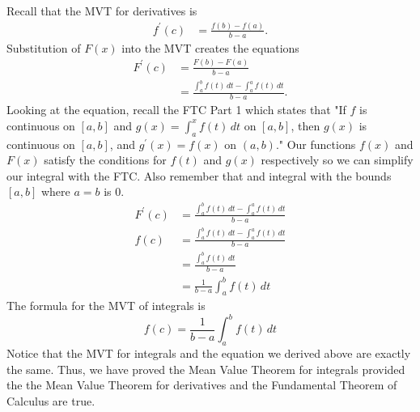 \documentclass{article}
\begin{document}
\begin{enumerate}[label=\textbf{(7.\arabic*)}]
Recall that the MVT for derivatives is
\begin{align*}
f^\prime(c) &= \frac{f(b)-f(a)}{b-a}\mathrm{.}
\end{align*}
Substitution of $F(x)$ into the MVT creates the equations
\begin{align*}
F^\prime(c) &= \frac{F(b)-F(a)}{b-a}\\
&= \frac{\int_a^b\!f(t)\,dt-\int_a^a\!f(t)\,dt}{b-a}\mathrm{.}
\end{align*}
Looking at the equation, recall the FTC Part 1 which states that "If $f$ is continuous on $[a,b]$ and $g(x)=\int_a^x\!f(t)\,dt$ on $[a,b]$, then $g(x)$ is continuous on $[a,b]$, and $g^\prime(x)=f(x)$ on $(a,b)$." Our functions $f(x)$ and $F(x)$ satisfy the conditions for $f(t)$ and $g(x)$ respectively so we can simplify our integral with the FTC. Also remember that and integral with the bounds $[a,b]$ where $a=b$ is 0. 
\begin{align*}
F^\prime(c) &= \frac{\int_a^b\!f(t)\,dt-\int_a^a\!f(t)\,dt}{b-a}\\
f(c) &= \frac{\int_a^b\!f(t)\,dt-\int_a^a\!f(t)\,dt}{b-a}\\
&= \frac{\int_a^b\!f(t)\,dt}{b-a}\\
&= \frac{1}{b-a}\int_a^b\!f(t)\,dt
\end{align*}
The formula for the MVT of integrals is
\[f(c)=\frac{1}{b-a}\int_a^b\!f(t)\,dt\]
Notice that the MVT for integrals and the equation we derived above are exactly the same. Thus, we have proved the Mean Value Theorem for integrals provided the the Mean Value Theorem for derivatives and the Fundamental Theorem of Calculus are true.


\end{enumerate}
\end{document}
